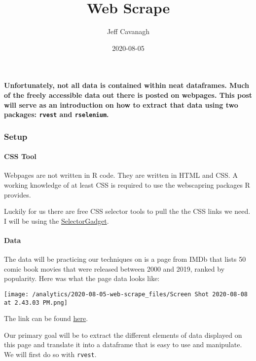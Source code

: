 \documentclass[]{article}
\title{Web Scrape}
\author{Jeff Cavanagh}
\date{2020-08-05}
\let\oldparagraph\paragraph
\renewcommand{\paragraph}[1]{\oldparagraph{#1}\mbox{}}
\begin{document}
\maketitle

\textbf{Unfortunately, not all data is contained within neat dataframes.
Much of the freely accessible data out there is posted on webpages. This
post will serve as an introduction on how to extract that data using two
packages: \texttt{rvest} and \texttt{rselenium}.}

\hypertarget{setup}{%
\subsubsection{Setup}\label{setup}}

\hypertarget{css-tool}{%
\paragraph{CSS Tool}\label{css-tool}}

Webpages are not written in R code. They are written in HTML and CSS. A
working knowledge of at least CSS is required to use the webscapring
packages R provides.

Luckily for us there are free CSS selector tools to pull the the CSS
links we need. I will be using the
\href{https://selectorgadget.com/}{SelectorGadget}.

\hypertarget{data}{%
\paragraph{Data}\label{data}}

The data will be practicing our techniques on is a page from IMDb that
lists 50 comic book movies that were released between 2000 and 2019,
ranked by popularity. Here was what the page data looks like:

\texttt{[image: /analytics/2020-08-05-web-scrape\_files/Screen Shot 2020-08-08 at 2.43.03 PM.png]}

The link can be found
\href{https://www.imdb.com/search/keyword/?keywords=based-on-comic-book\%2Csuperhero\&pf_rd_m=A2FGELUUNOQJNL\&pf_rd_p=a581b14c-5a82-4e29-9cf8-54f909ced9e1\&pf_rd_r=HA259SA49EFNVTHNRH2V\&pf_rd_s=center-5\&pf_rd_t=15051\&pf_rd_i=genre\&ref_=kw_ref_yr\&sort=moviemeter,asc\&mode=detail\&page=1\&title_type=movie\&release_date=2000\%2C2019}{here}.

Our primary goal will be to extract the different elements of data
displayed on this page and translate it into a dataframe that is easy to
use and manipulate. We will first do so with \texttt{rvest}.
\end{document}
